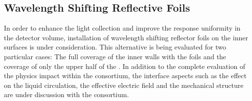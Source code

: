 \subsection{Wavelength Shifting Reflective Foils}
\label{sec:dp-pds-appendix-wlsfoils}

In order to enhance the light collection and improve the response uniformity in the detector volume, installation of wavelength shifting reflector foils on the  inner surfaces is under consideration. This alternative is being evaluated for two particular cases: The full coverage of the  inner walls with the foils and the coverage of only the upper half of the . In addition to the complete evaluation of the physics impact within the consortium, the interface aspects such as the effect on the liquid circulation, the effective electric field and the mechanical structure are under discussion with the  consortium.

